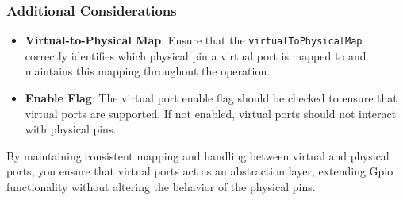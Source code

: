 \subsubsection{Additional Considerations}

\begin{itemize}[noitemsep]
    \item \textbf{Virtual-to-Physical Map}: Ensure that the \texttt{virtualToPhysicalMap} correctly identifies which physical pin a virtual port is mapped to and maintains this mapping throughout the operation.
    \item \textbf{Enable Flag}: The virtual port enable flag should be checked to ensure that virtual ports are supported. If not enabled, virtual ports should not interact with physical pins.
\end{itemize}

By maintaining consistent mapping and handling between virtual and physical ports, you ensure that virtual ports act as an abstraction layer, extending Gpio functionality without altering the behavior of the physical pins.
